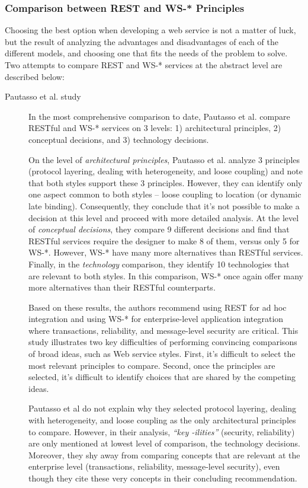 \subsubsection{Comparison between REST and WS-* Principles}
Choosing the best option when developing a web service is not a matter of luck, but the result of analyzing the advantages and disadvantages of each of the different models, and choosing one that fits the needs of the problem to solve. Two attempts to compare REST and WS-* services at the abstract level are described below:

\begin{description}
\item[Pautasso et al. study] In the most comprehensive comparison to date, Pautasso et al.\cite{Pautasso:2008} compare RESTful and WS-* services on 3 levels: 1) architectural principles, 2) conceptual decisions, and 3) technology decisions.

On the level of \emph{architectural principles}, Pautasso et al. analyze 3 principles (protocol layering, dealing with heterogeneity, and loose coupling) and note that both styles support these 3 principles. However, they can identify only one aspect common to both styles -- loose coupling to location (or dynamic late binding). Consequently, they conclude that it's not possible to make a decision at this level and proceed with more detailed analysis. At the level of \emph{conceptual decisions}, they compare 9 different decisions and find that RESTful services require the designer to make 8 of them, versus only 5 for WS-*. However, WS-* have many more alternatives than RESTful services. Finally, in the \emph{technology} comparison, they identify 10 technologies that are relevant to both styles. In this comparison, WS-* once again offer many more alternatives than their RESTful counterparts.

Based on these results, the authors recommend using REST for ad hoc integration and using WS-* for enterprise-level application integration where transactions, reliability, and message-level security are critical. This study illustrates two key difficulties of performing convincing comparisons of broad ideas, such as Web service styles. First, it's difficult to select the most relevant principles to compare. Second, once the principles are selected, it's difficult to identify choices that are shared by the competing ideas.

Pautasso et al do not explain why they selected protocol layering, dealing with heterogeneity, and loose coupling as the only architectural principles to compare. However, in their analysis, \textit{``key -ilities''} (security, reliability) are only mentioned at lowest level of comparison, the technology decisions. Moreover, they shy away from comparing concepts that are relevant at the enterprise level (transactions, reliability, message-level security), even though they cite these very concepts in their concluding recommendation.


\end{description}
